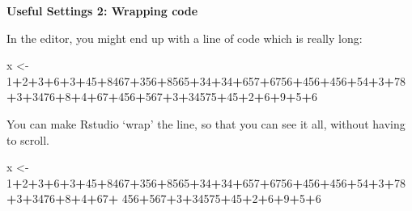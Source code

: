 \documentclass[]{book}
\newenvironment{Shaded}{\begin{snugshade}}{\end{snugshade}}
\newcommand{\DecValTok}[1]{\textcolor[rgb]{0.00,0.00,0.81}{#1}}
\newcommand{\NormalTok}[1]{#1}
\newcommand{\OperatorTok}[1]{\textcolor[rgb]{0.81,0.36,0.00}{\textbf{#1}}}
\newcommand{\StringTok}[1]{\textcolor[rgb]{0.31,0.60,0.02}{#1}}
\begin{document}
\textbf{Useful Settings 2: Wrapping code}

In the editor, you might end up with a line of code which is really long:

\begin{Shaded}
\begin{Highlighting}[]
\NormalTok{x <-}\StringTok{ }\DecValTok{1}\OperatorTok{+}\DecValTok{2}\OperatorTok{+}\DecValTok{3}\OperatorTok{+}\DecValTok{6}\OperatorTok{+}\DecValTok{3}\OperatorTok{+}\DecValTok{45}\OperatorTok{+}\DecValTok{8467}\OperatorTok{+}\DecValTok{356}\OperatorTok{+}\DecValTok{8565}\OperatorTok{+}\DecValTok{34}\OperatorTok{+}\DecValTok{34}\OperatorTok{+}\DecValTok{657}\OperatorTok{+}\DecValTok{6756}\OperatorTok{+}\DecValTok{456}\OperatorTok{+}\DecValTok{456}\OperatorTok{+}\DecValTok{54}\OperatorTok{+}\DecValTok{3}\OperatorTok{+}\DecValTok{78}\OperatorTok{+}\DecValTok{3}\OperatorTok{+}\DecValTok{3476}\OperatorTok{+}\DecValTok{8}\OperatorTok{+}\DecValTok{4}\OperatorTok{+}\DecValTok{67}\OperatorTok{+}\DecValTok{456}\OperatorTok{+}\DecValTok{567}\OperatorTok{+}\DecValTok{3}\OperatorTok{+}\DecValTok{34575}\OperatorTok{+}\DecValTok{45}\OperatorTok{+}\DecValTok{2}\OperatorTok{+}\DecValTok{6}\OperatorTok{+}\DecValTok{9}\OperatorTok{+}\DecValTok{5}\OperatorTok{+}\DecValTok{6}
\end{Highlighting}
\end{Shaded}

You can make Rstudio `wrap' the line, so that you can see it all, without having to scroll.

\begin{Shaded}
\begin{Highlighting}[]
\NormalTok{x <-}\StringTok{ }\DecValTok{1}\OperatorTok{+}\DecValTok{2}\OperatorTok{+}\DecValTok{3}\OperatorTok{+}\DecValTok{6}\OperatorTok{+}\DecValTok{3}\OperatorTok{+}\DecValTok{45}\OperatorTok{+}\DecValTok{8467}\OperatorTok{+}\DecValTok{356}\OperatorTok{+}\DecValTok{8565}\OperatorTok{+}\DecValTok{34}\OperatorTok{+}\DecValTok{34}\OperatorTok{+}\DecValTok{657}\OperatorTok{+}\DecValTok{6756}\OperatorTok{+}\DecValTok{456}\OperatorTok{+}\DecValTok{456}\OperatorTok{+}\DecValTok{54}\OperatorTok{+}\DecValTok{3}\OperatorTok{+}\DecValTok{78}\OperatorTok{+}\DecValTok{3}\OperatorTok{+}\DecValTok{3476}\OperatorTok{+}\DecValTok{8}\OperatorTok{+}\DecValTok{4}\OperatorTok{+}\DecValTok{67}\OperatorTok{+}
\DecValTok{456}\OperatorTok{+}\DecValTok{567}\OperatorTok{+}\DecValTok{3}\OperatorTok{+}\DecValTok{34575}\OperatorTok{+}\DecValTok{45}\OperatorTok{+}\DecValTok{2}\OperatorTok{+}\DecValTok{6}\OperatorTok{+}\DecValTok{9}\OperatorTok{+}\DecValTok{5}\OperatorTok{+}\DecValTok{6}
\end{Highlighting}
\end{Shaded}
\end{document}

